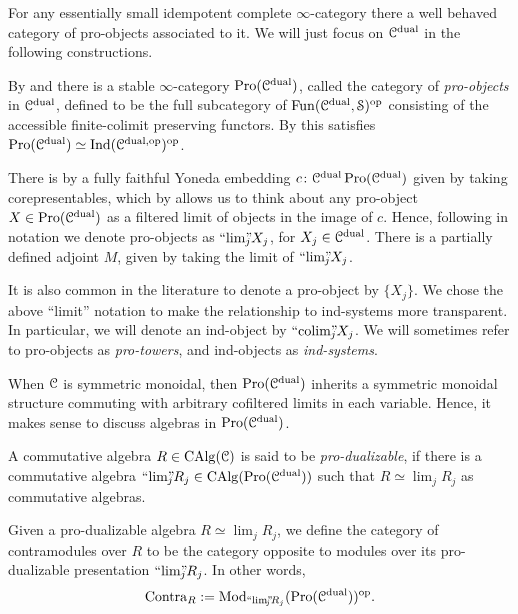 For any essentially small idempotent complete $\infty$-category there a well behaved category of pro-objects associated to it. We will just focus on $\EuScript{C}^{\mathrm{dual}}$ in the following constructions. 

\begin{construction}
    By \cite[A.8.1.1]{lurie_SAG} and \cite[2.5]{kerz-saito-tamme_2019} there is a stable $\infty$-category $\operatorname{Pro}(\EuScript{C}^{\mathrm{dual}})$, called the category of \emph{pro-objects} in $\EuScript{C}^{\mathrm{dual}}$, defined to be the full subcategory of $\operatorname{Fun}(\EuScript{C}^{\mathrm{dual}}, \EuScript{S})^{\mathrm{op}}$ consisting of the accessible finite-colimit preserving functors. By \cite[A.8.1.2]{lurie_SAG} this satisfies $\operatorname{Pro}(\EuScript{C}^{\mathrm{dual}}) \simeq \operatorname{Ind}(\EuScript{C}^{\mathrm{dual}, \mathrm{op}})^{\mathrm{op}}$. 
\end{construction}

There is by \cite[A.8.1.3]{lurie_SAG} a fully faithful Yoneda embedding $c\colon \EuScript{C}^{\mathrm{dual}} \operatorname{Pro}(\EuScript{C}^{\mathrm{dual}})$ given by taking corepresentables, which by \cite[A.8.1.5]{lurie_SAG} allows us to think about any pro-object $X \in \operatorname{Pro}(\EuScript{C}^{\mathrm{dual}})$ as a filtered limit of objects in the image of $c$. Hence, following \cite{kerz-saito-tamme_2019} in notation we denote pro-objects as $``\!\lim\!"_{\hspace{-5pt} j} X_j$, for $X_j \in \EuScript{C}^{\mathrm{dual}}$. There is a partially defined adjoint $M$, given by taking the limit of $``\!\lim\!"_{\hspace{-5pt} j} X_j$. 

\begin{remark}
    It is also common in the literature to denote a pro-object by $\{X_j\}$. We chose the above ``limit'' notation to make the relationship to ind-systems more transparent. In particular, we will denote an ind-object by $``\!\operatorname{colim}\!"_{\hspace{-5pt} j} X_j$. We will sometimes refer to pro-objects as \emph{pro-towers}, and ind-objects as \emph{ind-systems}.  
\end{remark}

When $\EuScript{C}$ is symmetric monoidal, then $\operatorname{Pro}(\EuScript{C}^{\mathrm{dual}})$ inherits a symmetric monoidal structure commuting with arbitrary cofiltered limits in each variable. Hence, it makes sense to discuss algebras in $\operatorname{Pro}(\EuScript{C}^{\mathrm{dual}})$. 

\begin{definition}
    A commutative algebra $R\in \operatorname{CAlg}(\EuScript{C})$ is said to be \emph{pro-dualizable}, if there is a commutative algebra $``\!\lim\!"_{\hspace{-5pt} j} R_j \in \operatorname{CAlg}(\operatorname{Pro}(\EuScript{C}^{\mathrm{dual}}))$ such that $R\simeq \lim_j R_j$ as commutative algebras.  
\end{definition}

\begin{definition}
    Given a pro-dualizable algebra $R \simeq \lim_j R_j$, we define the category of contramodules over $R$ to be the category opposite to modules over its pro-dualizable presentation $``\!\lim\!"_{\hspace{-5pt} j} R_j$. In other words, 
    \[\mathrm{Contra}_R := \mathrm{Mod}_{``\!\lim\!"_{\hspace{-5pt} j} R_j}(\operatorname{Pro}(\EuScript{C}^{\mathrm{dual}}))^{\mathrm{op}}.\]
\end{definition}

